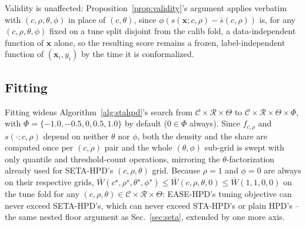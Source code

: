 \documentclass[10pt,twocolumn,a4paper]{article}
\begin{document}
Validity is unaffected: Proposition~\ref{prop:validity}'s argument applies verbatim with
$(c,\rho,\theta,\phi)$ in place of $(c,\theta)$, since $\phi(s(\bm x;c,\rho)-\bar s(c,\rho))$ is, for
any $(c,\rho,\theta,\phi)$ fixed on a tune split disjoint from the calib fold, a data-independent
function of $\bm x$ alone, so the resulting score remains a frozen, label-independent function of
$(\bm x_i,y_i)$ by the time it is conformalized.

\subsection{Fitting}
Fitting widens Algorithm~\ref{alg:stahpd}'s search from $\mathcal C\times\mathcal R\times\Theta$ to
$\mathcal C\times\mathcal R\times\Theta\times\Phi$, with $\Phi=\{-1.0,-0.5,0,0.5,1.0\}$ by default
($0\in\Phi$ always). Since $f_{c,\rho}$ and $s(\cdot;c,\rho)$ depend on neither $\theta$ nor $\phi$,
both the density and the share are computed once per $(c,\rho)$ pair and the whole $(\theta,\phi)$
sub-grid is swept with only quantile and threshold-count operations, mirroring the
$\theta$-factorization already used for SETA-HPD's $(c,\rho,\theta)$ grid. Because $\rho=1$ and
$\phi=0$ are always on their respective grids, $\bar W(c^\star,\rho^\star,\theta^\star,\phi^\star) \le
\bar W(c,\rho,\theta,0) \le \bar W(1,1,0,0)$ on the tune fold for any $(c,\rho,\theta)\in\mathcal
C\times\mathcal R\times\Theta$: EASE-HPD's tuning objective can never exceed SETA-HPD's, which can
never exceed STA-HPD's or plain HPD's -- the same nested floor argument as
Sec.~\ref{sec:seta}, extended by one more axis.
\end{document}
